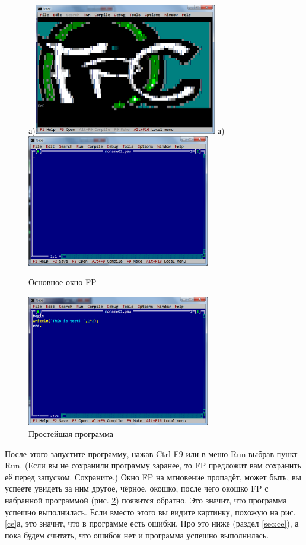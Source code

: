 \begin{figure}[p]
\centerline{
а)\includegraphics[width=8cm]{fpc-0.png}
а)\includegraphics[width=8cm]{fpc-noname.png}
}
\caption{Основное окно FP}
\label{fpc-0}
\end{figure}

\begin{figure}
\centerline{
\includegraphics[width=8cm]{first-prg.png}
}
\caption{Простейшая программа}
\label{first-prg}
\end{figure}

После этого запустите программу, нажав Ctrl-F9 или в меню Run выбрав пункт Run. (Если вы не сохранили программу заранее, то FP предложит вам сохранить её перед запуском. Сохраните.) Окно FP на мгновение
пропадёт, может быть, вы успеете увидеть за ним другое, чёрное, окошко, после чего окошко FP с набранной программой (рис. \ref{first-prg}) появится обратно. Это значит, что программа успешно выполнилась. Если вместо этого вы видите
картинку, похожую на рис. \ref{ce}а, это значит, что в программе есть ошибки. Про это ниже (раздел \ref{sec:ce}), а пока будем считать,
что ошибок нет и программа успешно выполнилась.

